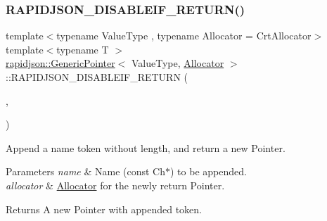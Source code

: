 \subsubsection{\texorpdfstring{RAPIDJSON\_DISABLEIF\_RETURN()}{RAPIDJSON\_DISABLEIF\_RETURN()}}
{\footnotesize\ttfamily template$<$typename Value\+Type , typename Allocator  = Crt\+Allocator$>$ \\
template$<$typename T $>$ \\
\mbox{\hyperlink{classrapidjson_1_1_generic_pointer}{rapidjson\+::\+Generic\+Pointer}}$<$ Value\+Type, \mbox{\hyperlink{classrapidjson_1_1_allocator}{Allocator}} $>$\+::R\+A\+P\+I\+D\+J\+S\+O\+N\+\_\+\+D\+I\+S\+A\+B\+L\+E\+I\+F\+\_\+\+R\+E\+T\+U\+RN (\begin{DoxyParamCaption}\item[{(internal\+::\+Not\+Expr$<$ internal\+::\+Is\+Same$<$ typename internal\+::\+Remove\+Const$<$ T $>$\+::\mbox{\hyperlink{namespacerapidjson_ae79a4751c1c460ff0de5ecc07874f3e4}{Type}}, \mbox{\hyperlink{classrapidjson_1_1_generic_pointer_a850f78846c5548565f8395be5f3427b7}{Ch}} $>$ $>$)}]{,  }\item[{(\mbox{\hyperlink{classrapidjson_1_1_generic_pointer}{Generic\+Pointer}}$<$ Value\+Type, \mbox{\hyperlink{classrapidjson_1_1_allocator}{Allocator}} $>$)}]{ }\end{DoxyParamCaption})}



Append a name token without length, and return a new Pointer. 


\begin{DoxyParams}{Parameters}
{\em name} & Name (const Ch$\ast$) to be appended. \\
\hline
{\em allocator} & \mbox{\hyperlink{classrapidjson_1_1_allocator}{Allocator}} for the newly return Pointer. \\
\hline
\end{DoxyParams}
\begin{DoxyReturn}{Returns}
A new Pointer with appended token. 
\end{DoxyReturn}
\mbox{\label{classrapidjson_1_1_generic_pointer_a91762c063f390c1463eb772dfd1b822b}} 
